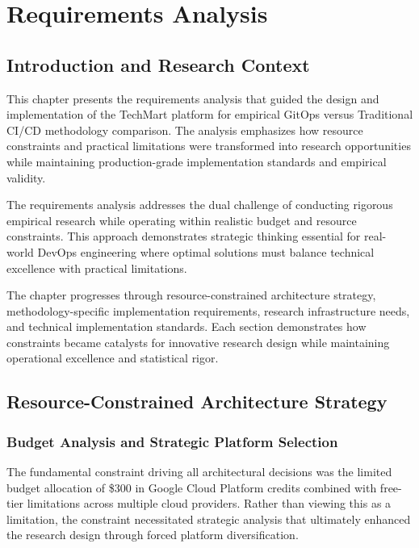 \chapter{Requirements Analysis}

\section{Introduction and Research Context}

This chapter presents the requirements analysis that guided the design and implementation of the TechMart platform for empirical GitOps versus Traditional CI/CD methodology comparison. The analysis emphasizes how resource constraints and practical limitations were transformed into research opportunities while maintaining production-grade implementation standards and empirical validity.

The requirements analysis addresses the dual challenge of conducting rigorous empirical research while operating within realistic budget and resource constraints. This approach demonstrates strategic thinking essential for real-world DevOps engineering where optimal solutions must balance technical excellence with practical limitations.

The chapter progresses through resource-constrained architecture strategy, methodology-specific implementation requirements, research infrastructure needs, and technical implementation standards. Each section demonstrates how constraints became catalysts for innovative research design while maintaining operational excellence and statistical rigor.

\section{Resource-Constrained Architecture Strategy}

\subsection{Budget Analysis and Strategic Platform Selection}

The fundamental constraint driving all architectural decisions was the limited budget allocation of \$300 in Google Cloud Platform credits combined with free-tier limitations across multiple cloud providers. Rather than viewing this as a limitation, the constraint necessitated strategic analysis that ultimately enhanced the research design through forced platform diversification.

